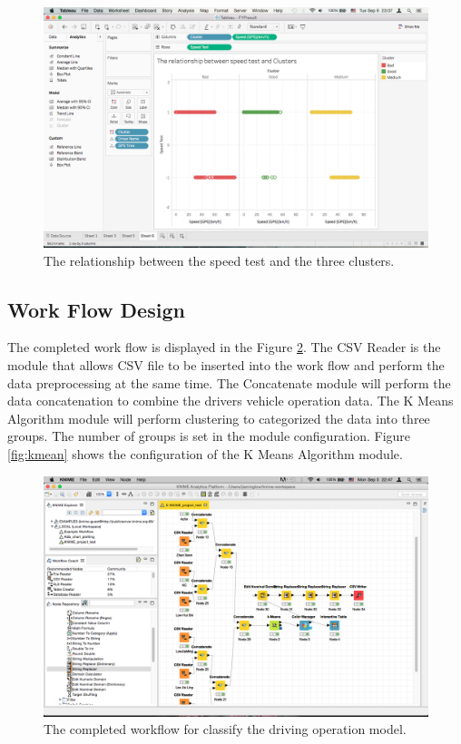 \begin{figure}[hbt!]\centering
\includegraphics[height=.5\textwidth]{image/clusterresult}
\caption{The relationship between the speed test and the three clusters.}
\label{fig:cluster_result}
\end{figure}


\subsection{Work Flow Design}
The completed work flow is displayed in the Figure \ref{fig:workflow}. The CSV Reader is the module that allows CSV file to be inserted into the work flow and perform the data preprocessing at the same time. The Concatenate module will perform the data concatenation to combine the drivers vehicle operation data. The K Means Algorithm module will perform clustering to categorized the data into three groups. The number of groups is set in the module configuration. Figure \ref{fig:kmean} shows the configuration of the K Means Algorithm module.

\begin{figure}[hbt!]\centering
\includegraphics[width=.75\textwidth]{image/KNIMEfile}
\caption{The completed workflow for classify the driving operation model.}
\label{fig:workflow}
\end{figure}

